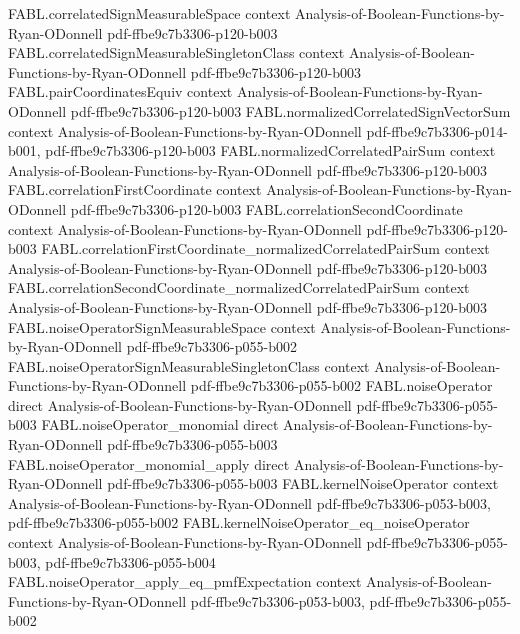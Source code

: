 \begin{theorem}
  {FABL.correlatedSignMeasurableSpace}
  {context}
  {Analysis-of-Boolean-Functions-by-Ryan-ODonnell}
  {pdf-ffbe9c7b3306-p120-b003}
\proofstep
  {FABL.correlatedSignMeasurableSingletonClass}
  {context}
  {Analysis-of-Boolean-Functions-by-Ryan-ODonnell}
  {pdf-ffbe9c7b3306-p120-b003}
\proofstep
  {FABL.pairCoordinatesEquiv}
  {context}
  {Analysis-of-Boolean-Functions-by-Ryan-ODonnell}
  {pdf-ffbe9c7b3306-p120-b003}
\proofstep
  {FABL.normalizedCorrelatedSignVectorSum}
  {context}
  {Analysis-of-Boolean-Functions-by-Ryan-ODonnell}
  {pdf-ffbe9c7b3306-p014-b001,
    pdf-ffbe9c7b3306-p120-b003}
\proofstep
  {FABL.normalizedCorrelatedPairSum}
  {context}
  {Analysis-of-Boolean-Functions-by-Ryan-ODonnell}
  {pdf-ffbe9c7b3306-p120-b003}
\proofstep
  {FABL.correlationFirstCoordinate}
  {context}
  {Analysis-of-Boolean-Functions-by-Ryan-ODonnell}
  {pdf-ffbe9c7b3306-p120-b003}
\proofstep
  {FABL.correlationSecondCoordinate}
  {context}
  {Analysis-of-Boolean-Functions-by-Ryan-ODonnell}
  {pdf-ffbe9c7b3306-p120-b003}
\proofstep
  {FABL.correlationFirstCoordinate_normalizedCorrelatedPairSum}
  {context}
  {Analysis-of-Boolean-Functions-by-Ryan-ODonnell}
  {pdf-ffbe9c7b3306-p120-b003}
\proofstep
  {FABL.correlationSecondCoordinate_normalizedCorrelatedPairSum}
  {context}
  {Analysis-of-Boolean-Functions-by-Ryan-ODonnell}
  {pdf-ffbe9c7b3306-p120-b003}
\proofstep
  {FABL.noiseOperatorSignMeasurableSpace}
  {context}
  {Analysis-of-Boolean-Functions-by-Ryan-ODonnell}
  {pdf-ffbe9c7b3306-p055-b002}
\proofstep
  {FABL.noiseOperatorSignMeasurableSingletonClass}
  {context}
  {Analysis-of-Boolean-Functions-by-Ryan-ODonnell}
  {pdf-ffbe9c7b3306-p055-b002}
\proofstep
  {FABL.noiseOperator}
  {direct}
  {Analysis-of-Boolean-Functions-by-Ryan-ODonnell}
  {pdf-ffbe9c7b3306-p055-b003}
\proofstep
  {FABL.noiseOperator_monomial}
  {direct}
  {Analysis-of-Boolean-Functions-by-Ryan-ODonnell}
  {pdf-ffbe9c7b3306-p055-b003}
\proofstep
  {FABL.noiseOperator_monomial_apply}
  {direct}
  {Analysis-of-Boolean-Functions-by-Ryan-ODonnell}
  {pdf-ffbe9c7b3306-p055-b003}
\proofstep
  {FABL.kernelNoiseOperator}
  {context}
  {Analysis-of-Boolean-Functions-by-Ryan-ODonnell}
  {pdf-ffbe9c7b3306-p053-b003,
    pdf-ffbe9c7b3306-p055-b002}
\proofstep
  {FABL.kernelNoiseOperator_eq_noiseOperator}
  {context}
  {Analysis-of-Boolean-Functions-by-Ryan-ODonnell}
  {pdf-ffbe9c7b3306-p055-b003,
    pdf-ffbe9c7b3306-p055-b004}
\proofstep
  {FABL.noiseOperator_apply_eq_pmfExpectation}
  {context}
  {Analysis-of-Boolean-Functions-by-Ryan-ODonnell}
  {pdf-ffbe9c7b3306-p053-b003,
    pdf-ffbe9c7b3306-p055-b002}

\end{theorem}
